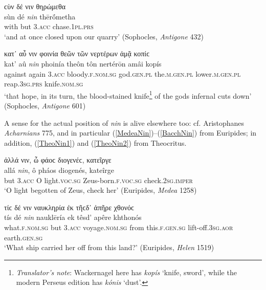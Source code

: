 \begin{exe}
\ex ϲὺν δέ {νιν} θηρώμεθα\\
\gll sùn dé \emph{nin} thērṓmetha\\
with but \textsc{3.acc} chase.\textsc{1pl.prs}\\
\trans `and at once closed upon our quarry' (Sophocles, \emph{Antigone} 432)
\label{SophTmes1}
\end{exe}

\begin{exe}
\ex κατ᾽ αὖ {νιν} φοινία θεῶν τῶν νερτέρων ἀμᾷ κοπίϲ\\
\gll kat' aû \emph{nin} phoinía theôn tôn nertérōn amâi kopís\\
against again \textsc{3.acc} bloody.\textsc{f.nom.sg} god.\textsc{gen.pl} the.\textsc{m.gen.pl} lower.\textsc{m.gen.pl} reap.\textsc{3sg.prs} knife.\textsc{nom.sg}\\
\trans `that hope, in its turn, the blood-stained knife\footnote{\emph{Translator's note}: Wackernagel here has \textit{kopís} `knife, sword', while the modern Perseus edition has \textit{kónis} `dust'.} of the gods infernal cuts down' (Sophocles, \emph{Antigone} 601)
\label{SophTmes2}
\end{exe}

A sense for the actual position of \emph{nin} is alive elsewhere too: cf. Aristophanes \emph{Acharnians} 775, and in particular (\ref{MedeaNin})--(\ref{BacchNin}) from Euripides; in addition, (\ref{TheoNin1}) and (\ref{TheoNin2}) from Theocritus.

\begin{exe}
\ex ἀλλά {νιν}, ὦ φάοϲ διογενέϲ, κατεῖργε\\
\gll allá \emph{nin}, ô pháos diogenés, kateîrge\\
but \textsc{3.acc} O light.\textsc{voc.sg} Zeus-born.\textsc{f.voc.sg} check.\textsc{2sg.imper}\\
\trans `O light begotten of Zeus, check her' (Euripides, \emph{Medea} 1258)
\label{MedeaNin}
\end{exe}

\begin{exe}
\ex τίϲ δέ {νιν} ναυκληρία ἐκ τῆϲδ᾽ ἀπῆρε χθονόϲ\\
\gll tís dé \emph{nin} nauklēría ek têsd' apêre khthonós\\
what.\textsc{f.nom.sg} but \textsc{3.acc} voyage.\textsc{nom.sg} from this.\textsc{f.gen.sg} lift-off.\textsc{3sg.aor} earth.\textsc{gen.sg}\\
\trans `What ship carried her off from this land?' (Euripides, \emph{Helen} 1519)
\label{HelenaNin}
\end{exe}

